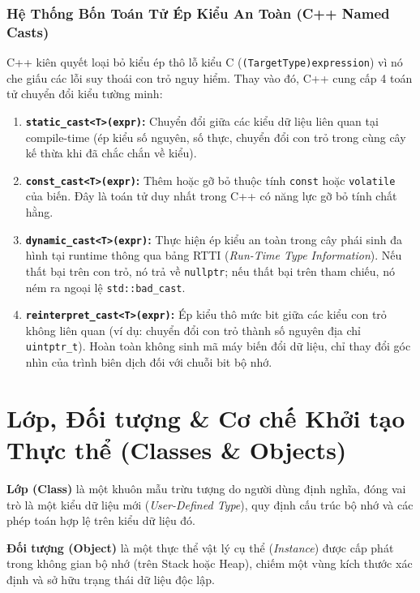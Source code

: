 \documentclass[12pt,a4paper,oneside]{book}
\begin{document}
\subsection{Hệ Thống Bốn Toán Tử Ép Kiểu An Toàn (C++ Named Casts)}

C++ kiên quyết loại bỏ kiểu ép thô lỗ kiểu C (\texttt{(TargetType)expression}) vì nó che giấu các lỗi suy thoái con trỏ nguy hiểm. Thay vào đó, C++ cung cấp 4 toán tử chuyển đổi kiểu tường minh:

\begin{enumerate}
    \item \textbf{\texttt{static\_cast<T>(expr)}:} Chuyển đổi giữa các kiểu dữ liệu liên quan tại compile-time (ép kiểu số nguyên, số thực, chuyển đổi con trỏ trong cùng cây kế thừa khi đã chắc chắn về kiểu).
    \item \textbf{\texttt{const\_cast<T>(expr)}:} Thêm hoặc gỡ bỏ thuộc tính \texttt{const} hoặc \texttt{volatile} của biến. Đây là toán tử duy nhất trong C++ có năng lực gỡ bỏ tính chất hằng.
    \item \textbf{\texttt{dynamic\_cast<T>(expr)}:} Thực hiện ép kiểu an toàn trong cây phái sinh đa hình tại runtime thông qua bảng RTTI (\textit{Run-Time Type Information}). Nếu thất bại trên con trỏ, nó trả về \texttt{nullptr}; nếu thất bại trên tham chiếu, nó ném ra ngoại lệ \texttt{std::bad\_cast}.
    \item \textbf{\texttt{reinterpret\_cast<T>(expr)}:} Ép kiểu thô mức bit giữa các kiểu con trỏ không liên quan (ví dụ: chuyển đổi con trỏ thành số nguyên địa chỉ \texttt{uintptr\_t}). Hoàn toàn không sinh mã máy biến đổi dữ liệu, chỉ thay đổi góc nhìn của trình biên dịch đối với chuỗi bit bộ nhớ.
\end{enumerate}

\chapter{Lớp, Đối tượng \& Cơ chế Khởi tạo Thực thể (Classes \& Objects)}

\begin{theorybox}
\textbf{Lớp (Class)} là một khuôn mẫu trừu tượng do người dùng định nghĩa, đóng vai trò là một kiểu dữ liệu mới (\textit{User-Defined Type}), quy định cấu trúc bộ nhớ và các phép toán hợp lệ trên kiểu dữ liệu đó.

\textbf{Đối tượng (Object)} là một thực thể vật lý cụ thể (\textit{Instance}) được cấp phát trong không gian bộ nhớ (trên Stack hoặc Heap), chiếm một vùng kích thước xác định và sở hữu trạng thái dữ liệu độc lập.
\end{theorybox}
\end{document}
